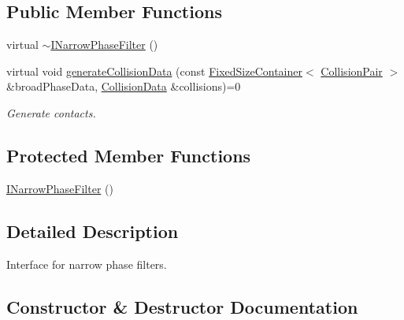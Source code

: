 \subsection*{Public Member Functions}
\begin{DoxyCompactItemize}
\item 
virtual \mbox{\hyperlink{classr3_1_1_i_narrow_phase_filter_a87d190166b99b0ace5e6005d9e62562b}{$\sim$\+I\+Narrow\+Phase\+Filter}} ()
\item 
virtual void \mbox{\hyperlink{classr3_1_1_i_narrow_phase_filter_a800e26eea0b0a899cde273e2931c22db}{generate\+Collision\+Data}} (const \mbox{\hyperlink{classr3_1_1_fixed_size_container}{Fixed\+Size\+Container}}$<$ \mbox{\hyperlink{classr3_1_1_collision_pair}{Collision\+Pair}} $>$ \&broad\+Phase\+Data, \mbox{\hyperlink{classr3_1_1_collision_data}{Collision\+Data}} \&collisions)=0
\begin{DoxyCompactList}\small\item\em Generate contacts. \end{DoxyCompactList}\end{DoxyCompactItemize}
\subsection*{Protected Member Functions}
\begin{DoxyCompactItemize}
\item 
\mbox{\hyperlink{classr3_1_1_i_narrow_phase_filter_a48c0812ce04a7e258c8fbbf34c8b85a6}{I\+Narrow\+Phase\+Filter}} ()
\end{DoxyCompactItemize}


\subsection{Detailed Description}
Interface for narrow phase filters. 

\subsection{Constructor \& Destructor Documentation}
\mbox{\label{classr3_1_1_i_narrow_phase_filter_a87d190166b99b0ace5e6005d9e62562b}} 
